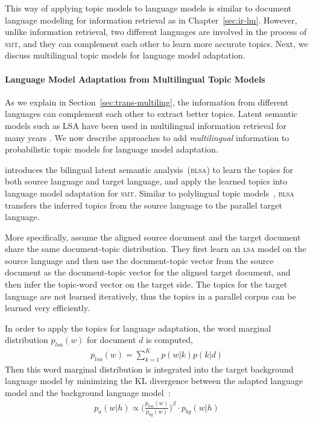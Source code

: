 This way of applying topic models to language models is 
similar to document language modeling for information retrieval
as in Chapter~\ref{sec:ir-lm}. However, unlike
information retrieval, two different languages are involved in the
process of \textsc{smt}, and they can complement each other to learn
more accurate topics. Next, we discuss multilingual topic models
for language model adaptation.

\paragraph{Language Model Adaptation from Multilingual Topic Models}


As we explain in Section~\ref{sec:trans-multiling}, the information
from different languages can complement each other to extract better
topics. Latent semantic models such as LSA have been used in
multilingual information retrieval for many years
\citep{carbonell1997translingual}.
We now describe approaches to add \emph{multilingual} information to probabilistic topic models
for language model adaptation.

\citet{Tam-2007} introduces the bilingual latent semantic
analysis~(\textsc{blsa}) to learn the topics for both source language
and target language, and apply the learned topics into language model
adaptation for \textsc{smt}. Similar to polylingual topic models~\citep{mimno-09}, 
\textsc{blsa} transfers the inferred
topics from the source language to the parallel target language.

More specifically, \citet{Tam-2007} assume the aligned source document
and the target document share the same document-topic distribution.
They first learn an \textsc{lsa} model on the source
language and then use the document-topic vector from the
source document as the document-topic vector for the aligned
target document, and then infer the topic-word vector on the
target side. The topics for the target language are not learned
iteratively, thus the topics in a parallel corpus can be learned very
efficiently.

In order to apply the topics for language adaptation, the word
marginal distribution $p_{lsa}(w)$ for document $d$ is computed,
\begin{align}
p_{lsa}(w) = \sum_{k=1}^K p(w|k) p(k|d)
\end{align}
Then this word marginal distribution is integrated into the target background language model by minimizing the KL divergence between the adapted language model and the background language model~\citep{Kneser-1997b}:
\begin{align}
\label{eq:mdi}
p_a(w|h) \propto \Big( \frac{p_{lsa}(w)}{p_{bg}(w)} \Big) ^{\beta} \cdot p_{bg}(w|h)
\end{align}

